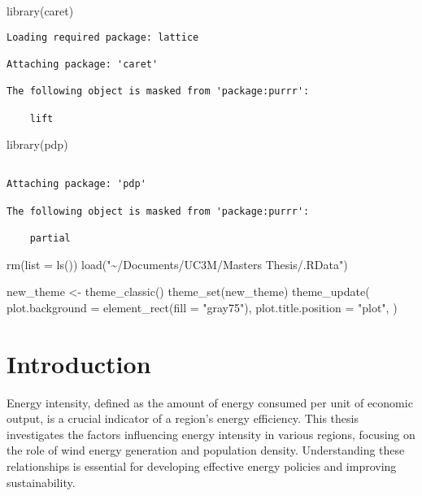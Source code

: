 \documentclass[
]{report}
\newenvironment{Shaded}{\begin{snugshade}}{\end{snugshade}}
\newcommand{\AttributeTok}[1]{\textcolor[rgb]{0.40,0.45,0.13}{#1}}
\newcommand{\FunctionTok}[1]{\textcolor[rgb]{0.28,0.35,0.67}{#1}}
\newcommand{\NormalTok}[1]{\textcolor[rgb]{0.00,0.23,0.31}{#1}}
\newcommand{\OtherTok}[1]{\textcolor[rgb]{0.00,0.23,0.31}{#1}}
\newcommand{\StringTok}[1]{\textcolor[rgb]{0.13,0.47,0.30}{#1}}
\begin{document}
\begin{Shaded}
\begin{Highlighting}[]
\FunctionTok{library}\NormalTok{(caret)}
\end{Highlighting}
\end{Shaded}

\begin{verbatim}
Loading required package: lattice

Attaching package: 'caret'

The following object is masked from 'package:purrr':

    lift
\end{verbatim}

\begin{Shaded}
\begin{Highlighting}[]
\FunctionTok{library}\NormalTok{(pdp)}
\end{Highlighting}
\end{Shaded}

\begin{verbatim}

Attaching package: 'pdp'

The following object is masked from 'package:purrr':

    partial
\end{verbatim}

\begin{Shaded}
\begin{Highlighting}[]
\FunctionTok{rm}\NormalTok{(}\AttributeTok{list =} \FunctionTok{ls}\NormalTok{())}
\FunctionTok{load}\NormalTok{(}\StringTok{"\textasciitilde{}/Documents/UC3M/Masters Thesis/.RData"}\NormalTok{)}

\NormalTok{new\_theme }\OtherTok{\textless{}{-}} \FunctionTok{theme\_classic}\NormalTok{()}
\FunctionTok{theme\_set}\NormalTok{(new\_theme)}
\FunctionTok{theme\_update}\NormalTok{(}
  \AttributeTok{plot.background =} \FunctionTok{element\_rect}\NormalTok{(}\AttributeTok{fill =} \StringTok{"gray75"}\NormalTok{),}
  \AttributeTok{plot.title.position =} \StringTok{"plot"}\NormalTok{,}
\NormalTok{)}
\end{Highlighting}
\end{Shaded}

\hypertarget{introduction}{%
\chapter{Introduction}\label{introduction}}

Energy intensity, defined as the amount of energy consumed per unit of
economic output, is a crucial indicator of a region's energy efficiency.
This thesis investigates the factors influencing energy intensity in
various regions, focusing on the role of wind energy generation and
population density. Understanding these relationships is essential for
developing effective energy policies and improving sustainability.
\end{document}
